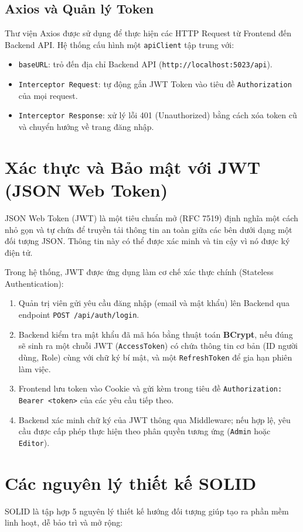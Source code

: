 \subsection{Axios và Quản lý Token}
Thư viện Axios được sử dụng để thực hiện các HTTP Request từ Frontend đến Backend API. Hệ thống cấu hình một \texttt{apiClient} tập trung với:
\begin{itemize}
    \item \texttt{baseURL}: trỏ đến địa chỉ Backend API (\texttt{http://localhost:5023/api}).
    \item \texttt{Interceptor Request}: tự động gắn JWT Token vào tiêu đề \texttt{Authorization} của mọi request.
    \item \texttt{Interceptor Response}: xử lý lỗi 401 (Unauthorized) bằng cách xóa token cũ và chuyển hướng về trang đăng nhập.
\end{itemize}

\section{Xác thực và Bảo mật với JWT (JSON Web Token)}
JSON Web Token (JWT) là một tiêu chuẩn mở (RFC 7519) định nghĩa một cách nhỏ gọn và tự chứa để truyền tải thông tin an toàn giữa các bên dưới dạng một đối tượng JSON. Thông tin này có thể được xác minh và tin cậy vì nó được ký điện tử.

Trong hệ thống, JWT được ứng dụng làm cơ chế xác thực chính (Stateless Authentication):
\begin{enumerate}
    \item Quản trị viên gửi yêu cầu đăng nhập (email và mật khẩu) lên Backend qua endpoint \texttt{POST /api/auth/login}.
    \item Backend kiểm tra mật khẩu đã mã hóa bằng thuật toán \textbf{BCrypt}, nếu đúng sẽ sinh ra một chuỗi JWT (\texttt{AccessToken}) có chứa thông tin cơ bản (ID người dùng, Role) cùng với chữ ký bí mật, và một \texttt{RefreshToken} để gia hạn phiên làm việc.
    \item Frontend lưu token vào Cookie và gửi kèm trong tiêu đề \texttt{Authorization: Bearer <token>} của các yêu cầu tiếp theo.
    \item Backend xác minh chữ ký của JWT thông qua Middleware; nếu hợp lệ, yêu cầu được cấp phép thực hiện theo phân quyền tương ứng (\texttt{Admin} hoặc \texttt{Editor}).
\end{enumerate}

\section{Các nguyên lý thiết kế SOLID}
SOLID là tập hợp 5 nguyên lý thiết kế hướng đối tượng giúp tạo ra phần mềm linh hoạt, dễ bảo trì và mở rộng:


